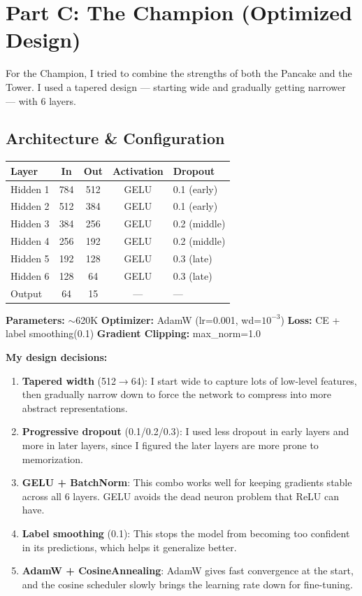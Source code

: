 \documentclass[12pt, a4paper]{article}
\begin{document}
\section{Part C: The Champion (Optimized Design)}

For the Champion, I tried to combine the strengths of both the Pancake and the Tower. I used a tapered design --- starting wide and gradually getting narrower --- with 6 layers.

\subsection{Architecture \& Configuration}

\begin{table}[H]
\centering
\begin{tabular}{lcccl}
\toprule
\textbf{Layer} & \textbf{In} & \textbf{Out} & \textbf{Activation} & \textbf{Dropout} \\
\midrule
Hidden 1 & 784 & 512  & GELU & 0.1 (early) \\
Hidden 2 & 512 & 384  & GELU & 0.1 (early) \\
Hidden 3 & 384 & 256  & GELU & 0.2 (middle) \\
Hidden 4 & 256 & 192  & GELU & 0.2 (middle) \\
Hidden 5 & 192 & 128  & GELU & 0.3 (late) \\
Hidden 6 & 128 & 64   & GELU & 0.3 (late) \\
Output   & 64  & 15   & ---  & --- \\
\bottomrule
\end{tabular}
\end{table}

\textbf{Parameters:} $\sim$620K \quad \textbf{Optimizer:} AdamW (lr=0.001, wd=$10^{-3}$) \quad \textbf{Loss:} CE + label smoothing(0.1) \quad \textbf{Gradient Clipping:} max\_norm=1.0

\textbf{My design decisions:}
\begin{enumerate}
    \item \textbf{Tapered width} (512$\to$64): I start wide to capture lots of low-level features, then gradually narrow down to force the network to compress into more abstract representations.
    \item \textbf{Progressive dropout} (0.1/0.2/0.3): I used less dropout in early layers and more in later layers, since I figured the later layers are more prone to memorization.
    \item \textbf{GELU + BatchNorm}: This combo works well for keeping gradients stable across all 6 layers. GELU avoids the dead neuron problem that ReLU can have.
    \item \textbf{Label smoothing} (0.1): This stops the model from becoming too confident in its predictions, which helps it generalize better.
    \item \textbf{AdamW + CosineAnnealing}: AdamW gives fast convergence at the start, and the cosine scheduler slowly brings the learning rate down for fine-tuning.
\end{enumerate}
\end{document}

